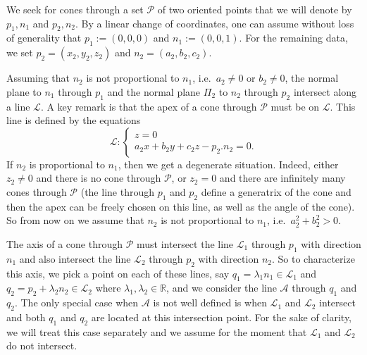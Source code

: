 \documentclass[5p]{elsarticle}
\newcommand\RR{\mathbb R}
\newcommand\Pc{\mathcal P}
\newcommand\Ac{\mathcal A}
\def\Lc{{\mathcal{L}}}
\newcommand{\com}[1]{{\color{black} #1}}
\begin{document}
We seek for cones through a set $\Pc$ of two oriented points that we will denote by $p_1,n_1$ and $p_2,n_2$. By a linear change of coordinates, one can assume without loss of generality that $p_1:=(0,0,0)$ and  $n_1:=(0,0,1)$. For the remaining data, we set $p_2=(x_2,y_2,z_2)$ and $n_2=(a_2,b_2,c_2)$.

\medskip

Assuming that $n_2$ is not proportional to $n_1$, i.e.~$a_2\neq 0$ or $b_2\neq 0$, the normal plane to $n_1$ through $p_1$ and the normal plane \com{$\Pi_2$} to $n_2$ through $p_2$ intersect along a line $\Lc$. A key remark is that the apex of a cone through $\Pc$ must be on $\Lc$. This line is defined by the equations 
$$\Lc : \left\{\begin{array}{l}
z=0\\
a_2x+b_2y+c_2z-p_2.n_2=0.	
\end{array}\right.
$$
If $n_2$ is proportional to $n_1$, then we get a \com{degenerate} situation. Indeed, either $z_2\neq 0$ and there is no cone through $\Pc$, \com{or} $z_2=0$ and there are infinitely many cones through $\Pc$ (the line through $p_1$ and $p_2$ define a generatrix of the cone and then the apex can be freely chosen on this line, as well as the angle of the cone). \com{So from} now on we  assume that $n_2$ is not proportional to $n_1$, i.e.~$a_2^2+b_2^2>0$.

\medskip 

The axis of a cone through $\Pc$ must intersect the line $\Lc_1$ through $p_1$ with direction $n_1$ and also intersect the line $\Lc_2$ through $p_2$ with direction $n_2$. So to characterize this axis, we pick a point on each of these lines, say $q_1=\lambda_1 n_1 \in \Lc_1$ and $q_2=p_2+\lambda_2n_2 \in \Lc_2$ where $\lambda_1, \lambda_2 \in \RR$, and we consider the line $\Ac$ through $q_1$ and $q_2$. The only special case when $\Ac$ is not well defined is when 
$\Lc_1$ and $\Lc_2$ intersect and both $q_1$ and $q_2$ are located at this intersection point. For the sake of clarity, we will treat this case separately and we assume for the moment that $\Lc_1$ and $\Lc_2$ do not intersect. 
\end{document}
